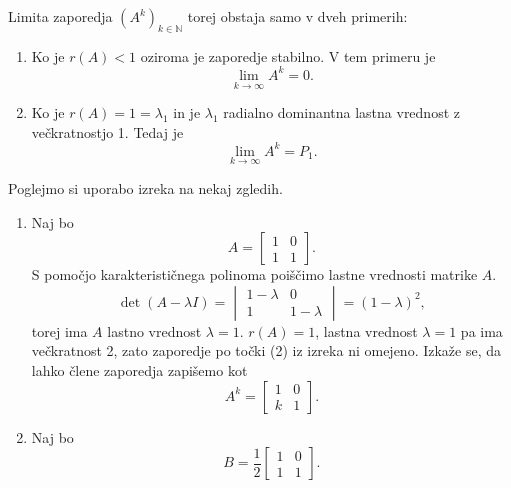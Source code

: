 \documentclass[mat1]{fmfdelo}
\newcommand{\N}{\mathbb N}
\begin{document}
Limita zaporedja $(A^k)_{k\in\N}$ torej obstaja samo v dveh primerih:
\begin{enumerate}
    \item Ko je $r(A) < 1$ oziroma je zaporedje stabilno. V tem primeru je \[\lim_{k\rightarrow\infty} A^k = 0.\]
    \item Ko je $r(A) = 1 = \lambda_1$ in je $\lambda_1$ radialno dominantna lastna vrednost z večkratnostjo 1. Tedaj je \[\lim_{k\rightarrow\infty} A^k = P_1.\]
\end{enumerate}
Poglejmo si uporabo izreka na nekaj zgledih.
\begin{zgled}
    \leavevmode
    \begin{enumerate}
        \item Naj bo
        \begin{equation*}
            A =
            \begin{bmatrix}
                1 & 0 \\
                1 & 1
            \end{bmatrix}.
        \end{equation*}
        S pomočjo karakterističnega polinoma poiščimo lastne vrednosti matrike $A$.
        \begin{equation*}
            \det (A - \lambda I) =
            \begin{vmatrix}
                1-\lambda & 0 \\
                1 & 1-\lambda
            \end{vmatrix}
            = (1-\lambda)^2,
        \end{equation*}
        torej ima $A$ lastno vrednost $\lambda=1$. $r(A) = 1$, lastna vrednost $\lambda = 1$ pa ima večkratnost 2, zato zaporedje po točki (2) iz izreka ni omejeno. Izkaže se, da lahko člene zaporedja zapišemo kot
        \begin{equation*}
            A^k =
            \begin{bmatrix}
                1 & 0 \\
                k & 1
            \end{bmatrix}.
        \end{equation*}
        \item Naj bo
        \begin{equation*}
            B = \frac{1}{2}
            \begin{bmatrix}
                1 & 0 \\
                1 & 1
            \end{bmatrix}.

\end{equation*}
\end{enumerate}
\end{zgled}
\end{document}
